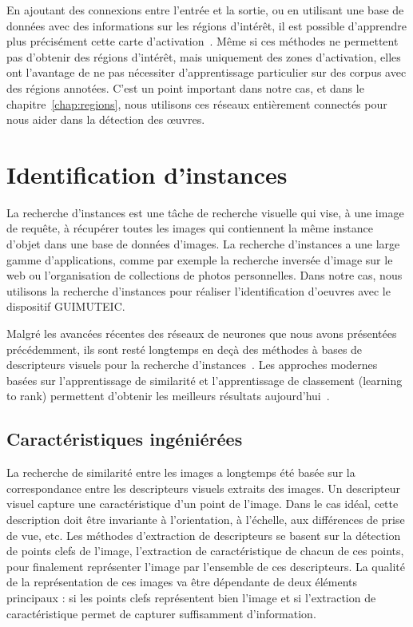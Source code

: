 En ajoutant des connexions entre l'entrée et la sortie, ou en utilisant une base de données avec des informations sur les régions d'intérêt, il est possible d'apprendre plus précisément cette carte d'activation~\cite{long_fully_2015}.
Même si ces méthodes ne permettent pas d'obtenir des régions d'intérêt, mais uniquement des zones d'activation, elles ont l'avantage de ne pas nécessiter d'apprentissage particulier sur des corpus avec des régions annotées.
C'est un point important dans notre cas, et dans le chapitre~\ref{chap:regions}, nous utilisons ces réseaux entièrement connectés pour nous aider dans la détection des œuvres. 



\section{Identification d'instances}
\label{sec:stateidentification}

La recherche d'instances est une tâche de recherche visuelle qui vise, à une image de requête, à récupérer toutes les images qui contiennent la même instance d'objet dans une base de données d'images. 
La recherche d'instances a une large gamme d’applications, comme par exemple la recherche inversée d’image sur le web ou l'organisation de collections de photos personnelles.
Dans notre cas, nous utilisons la recherche d'instances pour réaliser l'identification d'oeuvres avec le dispositif GUIMUTEIC.

Malgré les avancées récentes des réseaux de neurones que nous avons présentées précédemment, ils sont resté longtemps en deçà des méthodes à bases de descripteurs visuels pour la recherche d'instances~\cite{mikulik2013learning, tolias2014visual}.
Les approches modernes basées sur l'apprentissage de similarité et l'apprentissage de classement (learning to rank) permettent d'obtenir les meilleurs résultats aujourd'hui~\cite{gordo2016deep}.

\subsection{Caractéristiques ingéniérées}
\label{sec:ingeniere}

La recherche de similarité entre les images a longtemps été basée sur la correspondance entre les descripteurs visuels extraits des images.
Un descripteur visuel capture une caractéristique d'un point de l'image.
Dans le cas idéal, cette description doit être invariante à l'orientation, à l'échelle, aux différences de prise de vue, etc.
Les méthodes d'extraction de descripteurs se basent sur la détection de points clefs de l'image, l'extraction de caractéristique de chacun de ces points, pour finalement représenter l'image par l'ensemble de ces descripteurs.
La qualité de la représentation de ces images va être dépendante de deux éléments principaux : si les points clefs représentent bien l'image et si l'extraction de caractéristique permet de capturer suffisamment d'information.

